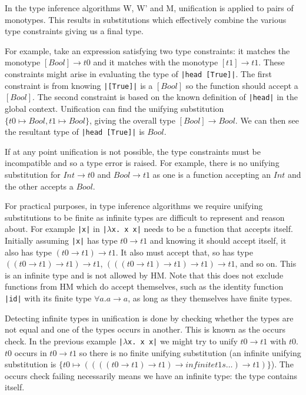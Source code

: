 \documentclass[a4paper,fleqn,12pt]{article}
\begin{document}
In the type inference algorithms W, W’ and M, unification is applied to pairs of monotypes. This results in substitutions which effectively combine the various type constraints giving us a final type.

For example, take an expression satisfying two type constraints: it matches the monotype $[Bool] \rightarrow t0$ and it matches with the monotype $[t1] \rightarrow t1$. These constraints might arise in evaluating the type of \texttt{|head [True]|}. The first constraint is from knowing \texttt{|[True]|} is a $[Bool]$ so the function should accept a $[Bool]$. The second constraint is based on the known definition of \texttt{|head|} in the global context. Unification can find the unifying substitution $\{ t0 \mapsto Bool, t1 \mapsto Bool \}$, giving the overall type $[Bool] \rightarrow Bool$. We can then see the resultant type of \texttt{|head [True]|} is $Bool$.

If at any point unification is not possible, the type constraints must be incompatible and so a type error is raised. For example, there is no unifying substitution for $Int \rightarrow t0$ and $Bool \rightarrow t1$ as one is a function accepting an $Int$ and the other accepts a $Bool$.

For practical purposes, in type inference algorithms we require unifying substitutions to be finite as infinite types are difficult to represent and reason about. For example \texttt{|x|} in \texttt{|$\lambda$x. x x|} needs to be a function that accepts itself. Initially assuming \texttt{|x|} has type $t0 \rightarrow t1$ and knowing it should accept itself, it also has type $(t0 \rightarrow t1) \rightarrow t1$. It also must accept that, so has type $((t0 \rightarrow t1) \rightarrow t1) \rightarrow t1$, $(((t0 \rightarrow t1) \rightarrow t1) \rightarrow t1) \rightarrow t1$, and so on. This is an infinite type and is not allowed by HM. Note that this does not exclude functions from HM which do accept themselves, such as the identity function \texttt{|id|} with its finite type $\forall a. a \rightarrow a$, as long as they themselves have finite types.

Detecting infinite types in unification is done by checking whether the types are not equal and one of the types occurs in another. This is known as the occurs check. In the previous example \texttt{|$\lambda$x. x x|} we might try to unify $t0 \rightarrow t1$ with $t0$. $t0$ occurs in $t0 \rightarrow t1$ so there is no finite unifying substitution (an infinite unifying substitution is $\{ t0 \mapsto ((((t0 \rightarrow t1) \rightarrow t1) \rightarrow infinite t1s \dots) \rightarrow t1) \}$). The occurs check failing necessarily means we have an infinite type: the type contains itself.
\end{document}
